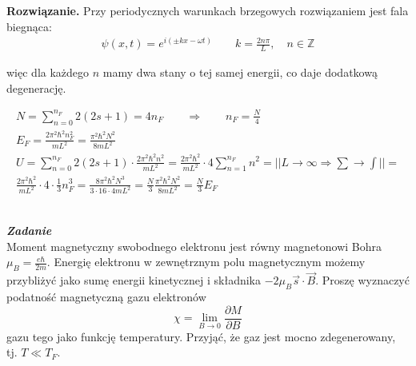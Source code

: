 \documentclass[11pt,a4paper]{article}
\newcounter{zadanie}\newcommand{\zadanie}[1][]{\addtocounter{zadanie}{1} ~\\ {\bf \emph{Zadanie \arabic{zadanie} #1 }} \\}
\newenvironment{solution}{\vspace{1cm} \par\textbf{Rozwiązanie.} \vspace{1cm}}{}
\begin{document}
\begin{solution}
Przy periodycznych warunkach brzegowych rozwiązaniem jest fala biegnąca:
\begin{align*}
\psi(x,t) = e^{i(\pm kx - \omega t)} \qquad k = \frac{2n\pi}{L}, \quad n \in \mathbb{Z}
\end{align*}

więc dla każdego $n$ mamy dwa stany o tej samej energii, co daje dodatkową degenerację.

\begin{align*}
N = \sum_{n=0}^{n_F} 2(2s+1) = 4n_F \qquad \Rightarrow 
\qquad n_F = \frac{N}{4} \\
E_F = \frac{2\pi^2 \hbar^2 n_F^2}{mL^2} = 
\frac{\pi^2 \hbar^2 N^2}{8 m L^2} \\
U = \sum_{n=0}^{n_F} 2(2s+1) \cdot \frac{2\pi^2 \hbar^2 n^2}{mL^2} = 
\frac{2\pi^2 \hbar^2}{mL^2} \cdot 4 \sum_{n=1}^{n_F} n^2 = 
|| L \rightarrow \infty  \Rightarrow \sum \rightarrow \int || = \\
\frac{2\pi^2 \hbar^2}{mL^2} \cdot 4 \cdot \frac{1}{3} n_F^3 =
\frac{8\pi^2 \hbar^2 N^3}{3\cdot16\cdot4 m L^2} = \frac{N}{3} \frac{\pi^2 \hbar^2 N^2}{8 m L^2} = \frac{N}{3} E_F
\end{align*}


\newpage
\end{solution}
\zadanie[]

Moment magnetyczny swobodnego elektronu jest równy magnetonowi Bohra 
$\mu_B = \frac{e\hbar}{2m}$. Energię elektronu w zewnętrznym
polu magnetycznym możemy przybliżyć jako sumę energii kinetycznej 
i składnika $- 2\mu_B \vec{s} \cdot \vec{B}$.
Proszę wyznaczyć podatność magnetyczną
gazu elektronów 
$$
\chi = \lim_{B\to 0}\frac{\partial M}{\partial B}
$$
gazu tego jako funkcję temperatury. 
Przyjąć, że gaz jest mocno zdegenerowany, tj. $T \ll T_F$.
\end{document}
